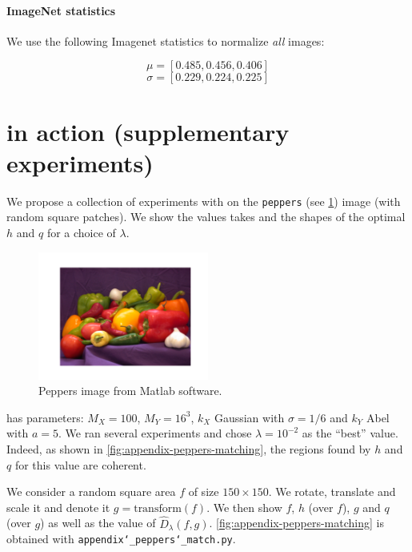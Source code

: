 \paragraph{ImageNet statistics}
We use the following Imagenet statistics to normalize \emph{all} images:

$$ \mu = [0.485, 0.456, 0.406]$$
$$ \sigma =[0.229, 0.224, 0.225]$$

\clearpage
\section{\Diffy in action (supplementary experiments)} \label{app:additional-experiments}

We propose a collection of experiments with \Diffy on the \texttt{peppers} (see \cref{fig:peppers}) image (with random square patches). We show the values \Diffy takes and the shapes of the optimal $h$ and $q$ for a choice of $\lambda$.


\begin{figure}[!h]
    \centering
    \includegraphics[width=0.5\textwidth]{ch1-diffy/figures/peppers.pdf}
    \caption{Peppers image from Matlab software.}
    \label{fig:peppers}
\end{figure}

\Diffy has parameters: $M_X = 100$, $M_Y = 16^3$, $k_X$ Gaussian with $\sigma = 1/6$ and $k_Y$ Abel with $a=5$. We ran several experiments and chose $\lambda = 10^{-2}$ as the ``best'' value. Indeed, as shown in \cref{fig:appendix-peppers-matching}, the regions found by $h$ and $q$ for this value are coherent.

We consider a random square area $f$ of size $150 \times 150$. We rotate, translate and scale it and denote it $g = \textrm{transform}(f)$. We then show $f$, $h$ (over $f$), $g$ and $q$ (over $g$) as well as the value of $\widehat D_\lambda(f, g)$. \cref{fig:appendix-peppers-matching} is obtained with \texttt{appendix\char`_peppers\char`_match.py}.

